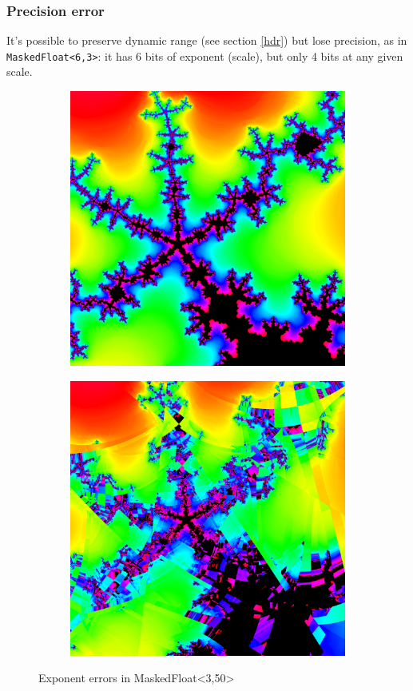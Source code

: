 \documentclass[sigconf,authorversion,nonacm]{acmart}
\begin{document}
\setcounter{subsubsection}{599609374}
\subsubsection{Precision error}

It's possible to preserve dynamic range (see section \ref{hdr}) but lose precision,
as in \texttt{MaskedFloat<6,3>}: it has 6 bits of exponent (scale), but only 4 bits at
any given scale.

\begin{figure}
    \begin{subfigure}[f64]
        \centering
        \includegraphics[width=0.35\linewidth]{images/3-masked_curves/curves_f64.png}
    \end{subfigure}
    \quad
    \begin{subfigure}[MaskedFloat]
        \centering
        \includegraphics[width=0.35\linewidth]{images/3-masked_curves/curves_MaskedFloat_3_50.png}
    \end{subfigure}
    \quad
    \caption{Exponent errors in MaskedFloat<3,50>}
    \label{fig:3-curves}
\end{figure}
\end{document}
